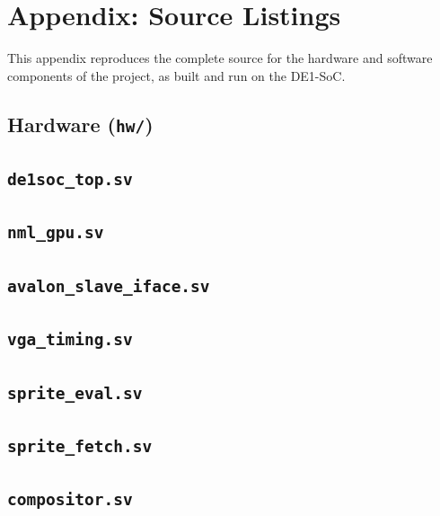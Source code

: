 \documentclass[11pt,letterpaper]{article}
\begin{document}
\appendix
\section*{Appendix: Source Listings}

This appendix reproduces the complete source for the hardware and software
components of the project, as built and run on the DE1-SoC.

\subsection*{Hardware (\texttt{hw/})}

\subsection*{\texttt{de1soc\_top.sv}}


\subsection*{\texttt{nml\_gpu.sv}}


\subsection*{\texttt{avalon\_slave\_iface.sv}}


\subsection*{\texttt{vga\_timing.sv}}


\subsection*{\texttt{sprite\_eval.sv}}


\subsection*{\texttt{sprite\_fetch.sv}}


\subsection*{\texttt{compositor.sv}}

\end{document}
